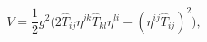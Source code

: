 \begin{equation}
V=\frac{1}{2}g^2\Bigr(2\hat T_{ij}\eta^{jk}\hat T_{kl}\eta^{li}
-(\eta^{ij}\hat T_{ij})^2\Bigr),
\end{equation}


